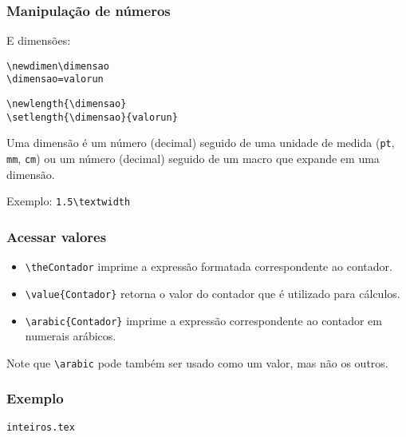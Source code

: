 \documentclass{beamer}
\newcommand{\code}[1]{\texttt{#1}}
\begin{document}
\begin{frame}
   \frametitle{Manipulação de números}
   E \alert{dimensões}:
   \begin{center}
      \begin{block}{}
         \begin{center}
            \code{\textbackslash newdimen\textbackslash dimensao}\\
            \code{\textbackslash dimensao=valor\alert{un}}
         \end{center}
      \end{block}
   \end{center}
   \begin{center}
      \begin{block}{}
         \begin{center}
            \code{\textbackslash newlength\{\textbackslash dimensao\}}\\
            \code{\textbackslash setlength\{\textbackslash dimensao\}\{valor\alert{un}\}}
         \end{center}
      \end{block}
   \end{center}
   Uma dimensão é um número (decimal) seguido de uma unidade de medida (\code{pt}, \code{mm}, \code{cm}) ou um número (decimal) seguido de um macro que expande em uma dimensão.
   
   Exemplo: \code{1.5\textbackslash textwidth}
\end{frame}
\begin{frame}
   \frametitle{Acessar valores}
   \begin{itemize}
      \item \code{\textbackslash theContador} imprime a expressão formatada correspondente ao contador.
      \item \code{\textbackslash value\{Contador\}} retorna o valor do contador que é utilizado para cálculos.
      \item \code{\textbackslash arabic\{Contador\}} imprime a expressão correspondente ao contador em numerais arábicos.
   \end{itemize}
   Note que \code{\textbackslash arabic} pode também ser usado como um valor, mas não os outros. 
\end{frame}
\begin{frame}
  \frametitle{Exemplo}
  \begin{center}
    \begin{block}{}
      \begin{center}
        \code{inteiros.tex}
      \end{center}
    \end{block}
  \end{center}
\end{frame}
\end{document}
